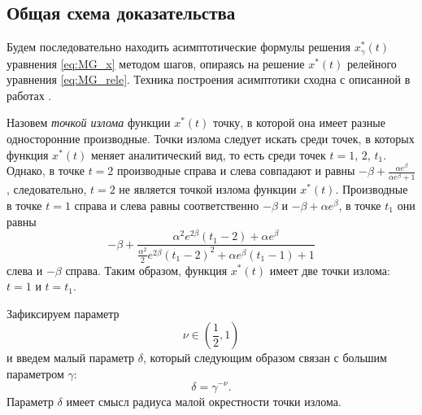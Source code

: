 \subsection{Общая схема доказательства}
Будем последовательно находить асимптотические формулы решения $x_{\gamma}^*(t)$ уравнения \eqref{eq:MG_x} методом шагов, опираясь на решение $x^*(t)$ релейного уравнения \eqref{eq:MG_rele}. Техника построения асимптотики сходна с описанной в работах \cite{Kolesov2010, Glyzin2013}.

Назовем \textit{точкой излома} функции $x^*(t)$ точку, в которой она имеет разные односторонние производные. Точки излома следует искать среди точек, в которых функция $x^*(t)$ меняет аналитический вид, то есть среди точек $t = 1$, $2$, $t_1$. Однако, в точке $t = 2$ производные справа и слева совпадают и равны $-\beta+\frac{\alpha e^{\beta}}{\alpha e^{\beta}+1}$, следовательно, $t = 2$ не является точкой излома функции $x^*(t)$. Производные в точке $t = 1$ справа и слева равны соответственно $-\beta$ и $-\beta + \alpha e^\beta$, в точке $t_1$ они равны
%
$$-\beta + \frac{\alpha^2 e^{2\beta}(t_1 - 2) + \alpha e^\beta}{\frac{\alpha^2}{2} e^{2\beta}(t_1-2)^2+\alpha e^{\beta}(t_1 - 1) + 1}$$
%
слева и $-\beta$ справа. 
Таким образом, функция $x^*(t)$ имеет две точки излома: $t = 1$ и $t = t_1$.

Зафиксируем параметр
%
\begin{equation}
	\label{eq:nu_small}
	\nu \in \left( \frac{1}{2}, 1 \right)
\end{equation}
%
и введем малый параметр $\delta$, который следующим образом связан с большим параметром $\gamma$:  
%
\[\delta=\gamma^{-\nu}.\]
%
Параметр $\delta$ имеет смысл радиуса малой окрестности точки излома.

